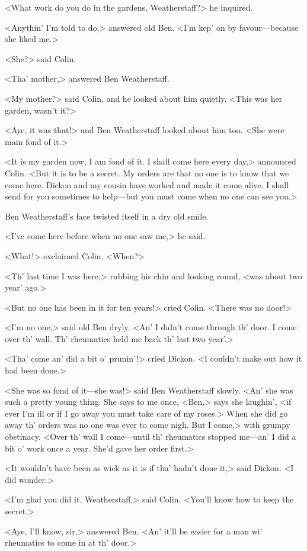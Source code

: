 <What work do you do in the gardens, Weatherstaff?> he inquired.

<Anythin' I'm told to do,> answered old Ben. <I'm kep' on by favour—because she liked me.>

<She?> said Colin.

<Tha' mother,> answered Ben Weatherstaff.

<My mother?> said Colin, and he looked about him quietly. <This was her garden, wasn't it?>

<Aye, it was that!> and Ben Weatherstaff looked about him too. <She were main fond of it.>

<It is my garden now, I am fond of it. I shall come here every day,> announced Colin. <But it is to be a secret. My orders are that no one is to know that we come here. Dickon and my cousin have worked and made it come alive. I shall send for you sometimes to help—but you must come when no one can see you.>

Ben Weatherstaff's face twisted itself in a dry old smile.

<I've come here before when no one saw me,> he said.

<What!> exclaimed Colin. <When?>

<Th' last time I was here,> rubbing his chin and looking round, <was about two year' ago.>

<But no one has been in it for ten years!> cried Colin. <There was no door!>

<I'm no one,> said old Ben dryly. <An' I didn't come through th' door. I come over th' wall. Th' rheumatics held me back th' last two year'.>

<Tha' come an' did a bit o' prunin'!> cried Dickon. <I couldn't make out how it had been done.>

<She was so fond of it—she was!> said Ben Weatherstaff slowly. <An' she was such a pretty young thing. She says to me once, <Ben,> says she laughin', <if ever I'm ill or if I go away you must take care of my roses.> When she did go away th' orders was no one was ever to come nigh. But I come,> with grumpy obstinacy. <Over th' wall I come—until th' rheumatics stopped me—an' I did a bit o' work once a year. She'd gave her order first.>

<It wouldn't have been as wick as it is if tha' hadn't done it,> said Dickon. <I did wonder.>

<I'm glad you did it, Weatherstaff,> said Colin. <You'll know how to keep the secret.>

<Aye, I'll know, sir,> answered Ben. <An' it'll be easier for a man wi' rheumatics to come in at th' door.>


